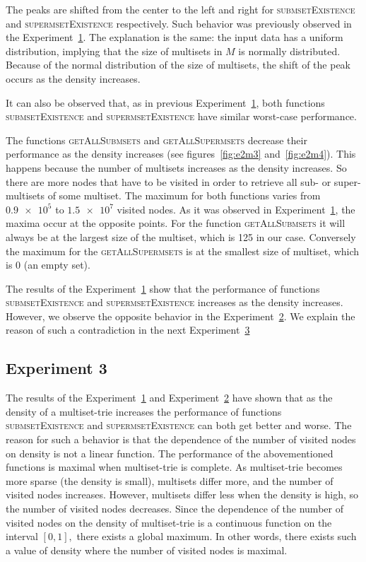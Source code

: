 The peaks are shifted from the center to the left and right for 
\textsc{submsetExistence} and \textsc{supermsetExistence} respectively. Such 
behavior was previously observed in the Experiment~\hyperref[s:exp1]{1}. The 
explanation is the same: the input data has a uniform distribution, implying that 
the size of multisets in $M$ is normally distributed. Because of the normal 
distribution of the size of multisets, the shift of the peak occurs as the density increases.

It can also be observed that, as in previous Experiment~\hyperref[s:exp1]{1}, both 
functions \textsc{submsetExistence} and \textsc{supermsetExistence} have similar 
worst-case performance. 

The functions \textsc{getAllSubmsets} and \textsc{getAllSupermsets} decrease 
their performance as the density increases (see figures~\ref{fig:e2m3} 
and~\ref{fig:e2m4}). This happens because the number of multisets increases as 
the density increases. So there are more nodes that have to be visited in order to 
retrieve all sub- or super-multisets of some multiset. The maximum for both functions 
varies from $\num{0.9e5}$ to $\num{1.5e7}$ visited nodes. As it was observed in 
Experiment~\hyperref[s:exp1]{1}, the maxima occur at the opposite points. For the 
function \textsc{getAllSubmsets} it will always be at the largest size of the multiset, 
which is 125 in our case. Conversely the maximum for the \textsc{getAllSupermsets} 
is at the smallest size of multiset, which is 0 (an empty set).

The results of the Experiment~\hyperref[s:exp1]{1} show that the performance 
of functions \textsc{submsetExistence} and \textsc{supermsetExistence} increases 
as the density increases. However, we observe the opposite behavior in the 
Experiment~\hyperref[s:exp2]{2}. We explain the reason of such a contradiction 
in the next Experiment~\hyperref[s:exp3]{3} 


\subsection{Experiment 3} \label{s:exp3}
The results of the Experiment~\hyperref[s:exp1]{1} and Experiment~\hyperref[s:exp2]{2} 
have shown that as the density of a multiset-trie increases the performance of 
functions \textsc{submsetExistence} and \textsc{supermsetExistence} can both get 
better and worse. The reason for such a behavior is that the dependence of the 
number of visited nodes on density is not a linear function. 
The performance of the abovementioned functions is maximal when multiset-trie is 
complete. As multiset-trie becomes more sparse (the density is small), multisets
differ more, and the number of visited nodes increases. However, multisets differ
less when the density is high, so the number of visited nodes decreases. Since 
the dependence of the number of visited nodes on the density of multiset-trie 
is a continuous function on the interval $[0,1],$ there exists a global maximum. 
In other words, there exists such a value of density where the number of visited 
nodes is maximal. 

